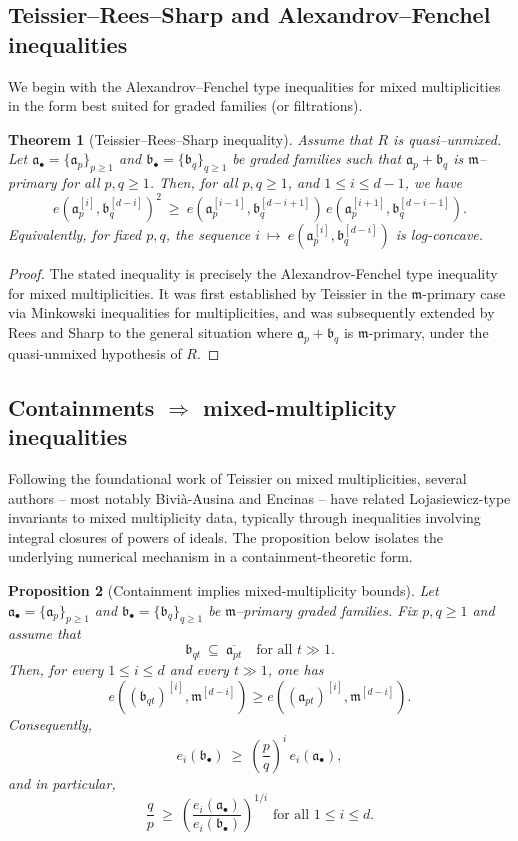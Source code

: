 \documentclass[12pt]{amsart}
\newcommand{\m}{\mathfrak m}
\renewcommand{\a}{\mathfrak{a}}
\renewcommand{\b}{\mathfrak{b}}
\newcommand{\abul}{{\a_\bullet}}
\newcommand{\bbul}{{\b_\bullet}}
\theoremstyle{plain}
\newtheorem{theorem}{Theorem}[section]
\newtheorem{proposition}[theorem]{Proposition}
\theoremstyle{definition}
\numberwithin{equation}{section}
\begin{document}
\subsection{Teissier--Rees--Sharp and Alexandrov--Fenchel inequalities}

We begin with the Alexandrov--Fenchel type inequalities for mixed multiplicities in the form
best suited for graded families (or filtrations).

\begin{theorem}[Teissier--Rees--Sharp inequality]\label{thm:AF-mixed}
Assume that $R$ is quasi--unmixed.
Let $\abul=\{\a_p\}_{p\ge 1}$ and $\bbul=\{\b_q\}_{q\ge 1}$ be graded families such that
$\a_p+\b_q$ is $\m$--primary for all $p,q\ge 1$.
Then, for all $p,q\ge 1$, and $1\le i\le d-1$, we have
\[
e\!\left(\a_{p}^{[i]},\b_{q}^{[d-i]}\right)^2
\ \ge\
e\!\left(\a_{p}^{[i-1]},\b_{q}^{[d-i+1]}\right)\,
e\!\left(\a_{p}^{[i+1]},\b_{q}^{[d-i-1]}\right).
\]
Equivalently, for fixed $p,q$, the sequence $i\ \longmapsto\  e\!\left(\a_{p}^{[i]},\b_{q}^{[d-i]}\right)$
is log-concave. 
\end{theorem}

\begin{proof}
The stated inequality is precisely the Alexandrov-Fenchel type inequality for mixed multiplicities. It was first established by Teissier \cite{Teissier77} in the $\m$-primary case via Minkowski inequalities for multiplicities, and was subsequently extended by Rees and Sharp \cite{ReesSharp78} to the general situation where $\a_p+\b_q$ is $\m$-primary, under the quasi-unmixed hypothesis of $R$.
\end{proof}
\subsection{Containments $\Rightarrow$ mixed-multiplicity inequalities}

Following the foundational work of Teissier on mixed multiplicities, several authors -- most notably Bivià-Ausina and Encinas \cite{Aus09, BE13} -- have related Lojasiewicz-type invariants to mixed multiplicity data, typically through inequalities involving integral closures of powers of ideals. The proposition below isolates the underlying numerical mechanism in a containment-theoretic form.

\begin{proposition}[Containment implies mixed-multiplicity bounds]\label{prop:containment-mixed}
Let $\abul=\{\a_p\}_{p\ge 1}$ and $\bbul=\{\b_q\}_{q\ge 1}$ be $\m$--primary graded families.
Fix $p,q\ge 1$ and assume that
\[
\b_{qt}\ \subseteq\ \overline{\a_{pt}}
\quad\text{for all }t\gg 1.
\]
Then, for every $1\le i\le d$ and every $t\gg 1$, one has
\[
e\!\left((\b_{qt})^{[i]},\m^{[d-i]}\right) \ge  e\!\left((\a_{pt})^{[i]},\m^{[d-i]}\right).
\]
Consequently,
\[
e_i(\bbul)\ \ge\ \left(\frac{p}{q}\right)^{\!i}\,e_i(\abul),
\]
and in particular,
\[
\frac{q}{p}\ \ge\
\left(\frac{e_i(\abul)}{e_i(\bbul)}\right)^{1/i}
\text{ for all } 1\le i\le d.
\]
\end{proposition}
\end{document}
